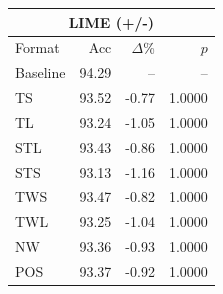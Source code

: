 \begin{tabular}{lrrr}
\toprule
\multicolumn{4}{c}{\textbf{LIME (+/-)}} \\
\midrule
Format & Acc & $\Delta$\% & $p$ \\
\midrule
Baseline & 94.29 & -- & -- \\
\midrule
TS & 93.52 & -0.77 & 1.0000 \\
TL & 93.24 & -1.05 & 1.0000 \\
STL & 93.43 & -0.86 & 1.0000 \\
STS & 93.13 & -1.16 & 1.0000 \\
TWS & 93.47 & -0.82 & 1.0000 \\
TWL & 93.25 & -1.04 & 1.0000 \\
NW & 93.36 & -0.93 & 1.0000 \\
POS & 93.37 & -0.92 & 1.0000 \\
\bottomrule
\end{tabular}
